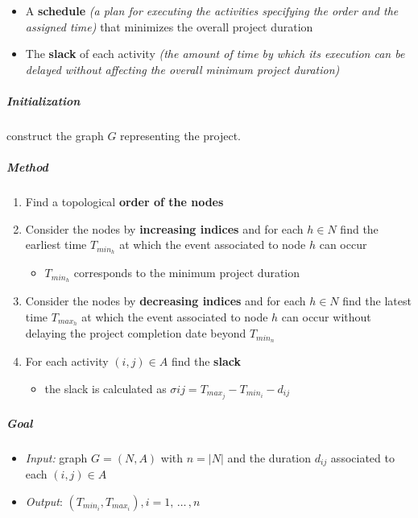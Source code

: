 \documentclass[english]{article}
\begin{document}
\begin{itemize}
  \item A \textbf{schedule} \textit{(a plan for executing the activities specifying the order and the assigned time)} that minimizes the overall project duration
  \item The \textbf{slack} of each activity \textit{(the amount of time by which its execution can be delayed without affecting the overall minimum project duration)}
\end{itemize}

\subparagraph*{Initialization}
construct the graph \(G\) representing the project.

\subparagraph*{Method}

\begin{enumerate}
  \item Find a topological \textbf{order of the nodes}
  \item Consider the nodes by \textbf{increasing indices} and for each \(h \in N\) find the earliest time \(T_{min_h}\) at which the event associated to node \(h\) can occur
        \begin{itemize}[label = \(\rightarrow\)]
          \item \(T_{min_h}\) corresponds to the minimum project duration
        \end{itemize}
  \item Consider the nodes by \textbf{decreasing indices} and for each \(h \in N\) find the latest time \(T_{max_h}\) at which the event associated to node \(h\) can occur without delaying the project completion date beyond \(T_{min_n}\)
  \item For each activity \(\left( i, j \right) \in A\) find the \textbf{slack}
        \begin{itemize}[label = \(\rightarrow\)]
          \item the slack is calculated as \(\sigma{ij} = T_{max_j} - T_{min_i} - d_{ij}\)
        \end{itemize}
\end{enumerate}

\subparagraph*{Goal}
\begin{itemize}[label=\(\rightarrow\)]
  \item \textit{Input:} graph \(G = (N, A)\) with \(n = |N|\) and the duration \(d_{ij}\) associated to each \(\left( i, j \right) \in A\)
  \item \textit{Output}: \(\left( T_{min_i}, T_{max_i} \right), i = 1, \, \ldots \,, n\)
\end{itemize}
\end{document}

